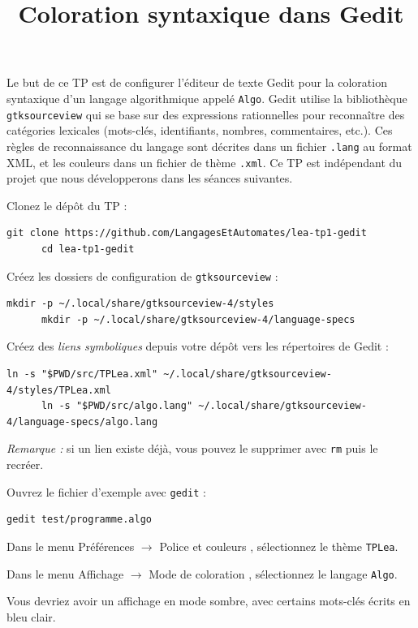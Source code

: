 \documentclass{td}
\title{Coloration syntaxique dans Gedit}
\begin{document}
\maketitle

Le but de ce TP est de configurer l'éditeur de texte Gedit pour 
la coloration syntaxique d'un langage algorithmique appelé \texttt{Algo}.
Gedit utilise la bibliothèque \texttt{gtksourceview}
qui se base sur des expressions rationnelles pour reconnaître des catégories lexicales
(mots-clés, identifiants, nombres, commentaires, etc.).
Ces règles de reconnaissance du langage sont décrites dans un fichier \texttt{.lang} au format XML,
et les couleurs dans un fichier de thème \texttt{.xml}.
Ce TP est indépendant du projet que nous développerons dans les séances suivantes.

\begin{exercice}

  \begin{question}
  \item Clonez le dépôt du TP :
    \begin{lstlisting}[gobble=6]
      git clone https://github.com/LangagesEtAutomates/lea-tp1-gedit
      cd lea-tp1-gedit
    \end{lstlisting}

  \item Créez les dossiers de configuration de \texttt{gtksourceview} :
    \begin{lstlisting}[gobble=6]
      mkdir -p ~/.local/share/gtksourceview-4/styles
      mkdir -p ~/.local/share/gtksourceview-4/language-specs
    \end{lstlisting}

  \item Créez des \emph{liens symboliques} depuis votre dépôt vers les répertoires de Gedit :
    \begin{lstlisting}[gobble=6]
      ln -s "$PWD/src/TPLea.xml" ~/.local/share/gtksourceview-4/styles/TPLea.xml
      ln -s "$PWD/src/algo.lang" ~/.local/share/gtksourceview-4/language-specs/algo.lang
    \end{lstlisting}

    \emph{Remarque :} si un lien existe déjà, vous pouvez le supprimer avec \lstinline|rm| puis le recréer.

  \item Ouvrez le fichier d'exemple avec \lstinline{gedit} :
    \begin{lstlisting}[gobble=6]
      gedit test/programme.algo
    \end{lstlisting}

  \item Dans le menu \og Préférences $\rightarrow$ Police et couleurs \fg, sélectionnez le thème \lstinline{TPLea}.

  \item Dans le menu \og Affichage $\rightarrow$ Mode de coloration \fg, sélectionnez le langage \lstinline{Algo}.
  \end{question}

  Vous devriez avoir un affichage en mode sombre, avec certains mots-clés écrits en bleu clair.
\end{exercice}
\end{document}
